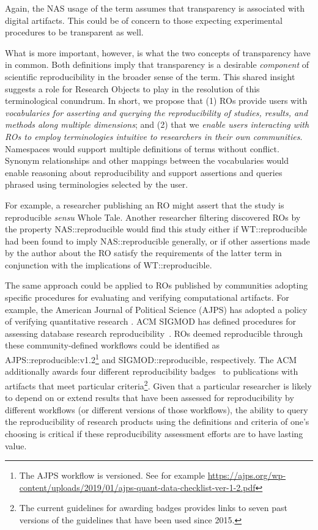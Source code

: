 \noindent Again, the NAS usage of the term assumes that transparency is associated with digital artifacts.
This could be of concern to those expecting experimental procedures to be transparent as well.

What is more important, however, is what the two concepts of transparency have in common.
Both definitions imply that transparency is a desirable \emph{component} of scientific
    reproducibility in the broader sense of the term.
This shared insight suggests a role for Research Objects to play in the resolution of this
    terminological conundrum.
In short, we propose that (1) ROs provide users with \emph{vocabularies for asserting and
    querying the reproducibility of studies, results, and methods along multiple dimensions};
    and (2) that we \emph{enable users interacting with ROs to employ terminologies intuitive to
    researchers in their own communities}.
Namespaces would support multiple definitions of terms without conflict.
Synonym relationships and other mappings between the vocabularies would enable reasoning about
    reproducibility and support assertions and queries phrased using terminologies selected by
    the user.

For example, a researcher publishing an RO might assert that the study is reproducible \emph{sensu}
    \textsf{Whole Tale}.
Another researcher filtering discovered ROs by the property \textsf{NAS::reproducible} would
    find this study either if \textsf{WT::reproducible} had been found to imply
    \textsf{NAS::reproducible} generally, or if other assertions made by the author
    about the RO satisfy the requirements of the latter term in conjunction with the
    implications of \textsf{WT::reproducible}.

The same approach could be applied to ROs published by communities adopting specific
    procedures for evaluating and verifying computational artifacts.
For example, the American Journal of Political Science (AJPS) has adopted a policy of
    verifying quantitative research \cite{christian2018}.
ACM SIGMOD has defined procedures for assessing database research
    reproducibility~\cite{bonnet_repeatability_2011, sigmod2018reproducibility}.
ROs deemed reproducible through these community-defined workflows could be
    identified as \textsf{AJPS::reproducible:v1.2}\footnote{
        The AJPS workflow is versioned. See for example
        \url{https://ajps.org/wp-content/uploads/2019/01/ajps-quant-data-checklist-ver-1-2.pdf}
    } and \textsf{SIGMOD::reproducible}, respectively.
The ACM additionally awards four different reproducibility badges~\cite{acm2018artifact} to publications
    with artifacts that meet particular criteria\footnote{The current guidelines for awarding
    badges provides links to seven past versions of the guidelines that have been used since 2015.}.
Given that a particular researcher is likely to depend on or extend results that have been
    assessed for reproducibility by different workflows (or different versions of those
    workflows), the ability to query the reproducibility of research products using the definitions and
    criteria of one's choosing is critical if these reproducibility assessment efforts
    are to have lasting value.

